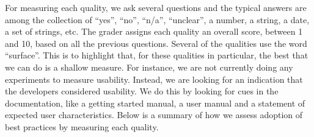 \documentclass[11pt]{article}
\begin{document}
For measuring each quality, we ask several questions and the typical answers are
among the collection of ``yes'', ``no'', ``n/a'', ``unclear'', a number, a
string, a date, a set of strings, etc. The grader assigns each quality an
overall score, between 1 and 10, based on all the previous questions.  Several
of the qualities use the word ``surface''.  This is to highlight that, for these
qualities in particular, the best that we can do is a shallow measure.  For
instance, we are not currently doing any experiments to measure usability.
Instead, we are looking for an indication that the developers considered
usability.  We do this by looking for cues in the documentation, like a getting
started manual, a user manual and a statement of expected user characteristics.
Below is a summary of how we assess adoption of best practices by measuring each
quality.
\end{document}
